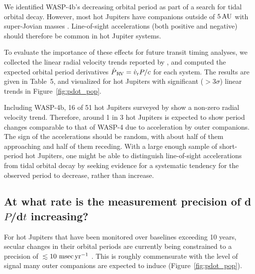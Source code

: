 \documentclass[12pt,twocolumn,tighten]{aastex62}
\begin{document}
We identified WASP-4b's decreasing orbital period as part of a search
for tidal orbital decay.  However, most hot Jupiters have companions
outside of $5\,{\rm AU}$ with super-Jovian masses
\citep{knutson_friends_2014,bryan_statistics_2016}.  Line-of-sight
accelerations (both positive and negative) should therefore be common
in hot Jupiter systems. 

To evaluate the importance of these effects for future transit timing
analyses, we collected the linear radial velocity trends reported by
\citet{knutson_friends_2014}, and computed the expected orbital period
derivatives $\dot{P}_{\rm\,RV} = \dot{v}_{\rm r} P/c$ for each system.
The results are given in Table~5, and visualized for hot Jupiters with
significant ($>$$3\sigma$) linear trends in Figure~\ref{fig:pdot_pop}.

Including WASP-4b, 16 of 51 hot Jupiters surveyed by
\citet{knutson_friends_2014} show a non-zero radial velocity trend.
Therefore, around 1 in 3 hot Jupiters is expected to show period
changes comparable to that of WASP-4 due to acceleration by outer
companions.  The sign of the accelerations should be random, with
about half of them approaching and half of them receding.  With a
large enough sample of short-period hot Jupiters, one might be able to
distinguish line-of-sight accelerations from tidal orbital decay by
seeking evidence for a systematic tendency for the observed period to
decrease, rather than increase.

\subsection{At what rate is the measurement precision of d$P$/d$t$
increasing?}
\label{sec:fisher}

For hot Jupiters that have been monitored over baselines exceeding 10
years, secular changes in their orbital periods are currently being
constrained to a precision of $\lesssim$$10~{\rm msec}\,{\rm yr}^{-1}$
\citep{wilkins_searching_2017,maciejewski_planet-star_2018,baluev_2019,petrucci_discarding_2020,patra_2020}.
This is roughly commensurate with the level of signal many outer
companions are expected to induce (Figure~\ref{fig:pdot_pop}).
\end{document}
